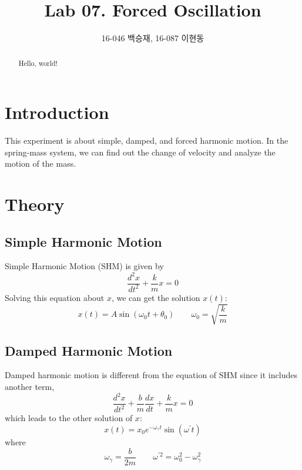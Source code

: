 \documentclass[a4paper]{article}
\author{16-046 백승재, 16-087 이현동}
\title{Lab 07. Forced Oscillation}
\begin{document}
\maketitle

\begin{abstract}
Hello, world!
\end{abstract}

\section{Introduction}
This experiment is about simple, damped, and forced harmonic motion. In the spring-mass system, we can find out the change of velocity and analyze the motion of the mass.
\section{Theory}
\subsection{Simple Harmonic Motion}
Simple Harmonic Motion (SHM) is given by
\begin{equation*}
    \frac{d^2x}{dt^2} + \frac{k}{m}x = 0
\end{equation*}
Solving this equation about $x$, we can get the solution $x(t)$:
\begin{equation*}
    x(t) = A \sin (\omega_0t + \theta_0) \qquad
    \omega_0 = \sqrt{\frac{k}{m}}
\end{equation*}
\subsection{Damped Harmonic Motion}
Damped harmonic motion is different from the equation of SHM since it includes another term,
\begin{equation*}
    \frac{d^2x}{dt^2} + \frac{b}{m}\frac{dx}{dt} +\frac{k}{m}x = 0
\end{equation*}
which leads to the other solution of $x$:
\begin{equation*}
    x(t) = x_0e^{-\omega_{\gamma}t}\sin(\omega^\prime t)
\end{equation*}
where
\begin{equation*}
    \omega_\gamma = \frac{b}{2m} \qquad \omega^{\prime 2} = \omega_0^2 - \omega_\gamma^2
\end{equation*}
\end{document}
